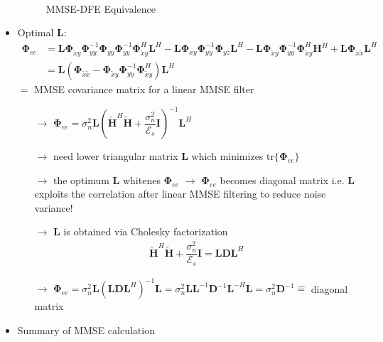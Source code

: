 \documentclass[a4paper, 10pt]{article}
\begin{document}
\begin{itemize}
\begin{align*}
	\end{align*}
	\begin{figure}[h]
		\centering
		\resizebox{\textwidth}{!}{}
		\caption{MMSE-DFE Equivalence}
		\label{MMSE_DFE_Equiv}
	\end{figure}
	\item Optimal $\mathbf{L}$:
	\begin{align*}
		\boldsymbol{\Phi}_{ee}&=\mathbf{L}\boldsymbol{\Phi}_{\tilde{x}y}\boldsymbol{\Phi}_{yy}^{-1}\boldsymbol{\Phi}_{yy}\boldsymbol{\Phi}_{yy}^{-1}\boldsymbol{\Phi}_{\tilde{x}y}^H\mathbf{L}^H
		-\mathbf{L}\boldsymbol{\Phi}_{xy}\boldsymbol{\Phi}_{yy}^{-1}\boldsymbol{\Phi}_{yz}\mathbf{L}^H
		-\mathbf{L}\boldsymbol{\Phi}_{\tilde{x}y}\boldsymbol{\Phi}_{yy}^{-1}\boldsymbol{\Phi}_{\tilde{x}y}^H\mathbf{H}^H+\mathbf{L}\boldsymbol{\Phi}_{\tilde{x}\tilde{x}}\mathbf{L}^H\\ 
		&=\mathbf{L}(\boldsymbol{\Phi}_{\tilde{x}\tilde{x}}-\boldsymbol{\Phi}_{\tilde{x}y}\boldsymbol{\Phi}_{yy}^{-1}\boldsymbol{\Phi}_{\tilde{x}y}^H)\mathbf{L}^H
	\end{align*}
	$=$ MMSE covariance matrix for a linear MMSE filter
	\begin{itemize}
		\item[$\rightarrow$]$\boldsymbol{\Phi}_{ee}=\sigma_n^2\mathbf{L}(\tilde{\mathbf{H}}^H\tilde{\mathbf{H}}+\dfrac{\sigma_n^2}{\mathcal{E}_s}\mathbf{I})^{-1}\mathbf{L}^H$
		\item[$\rightarrow$] need lower triangular matrix $\mathbf{L}$ which minimizes $\mathrm{tr}\{\boldsymbol{\Phi}_{ee}\}$
		\item[$\rightarrow$] the optimum $\mathbf{L}$ whitenes $\boldsymbol{\Phi}_{ee}$ $\rightarrow$  $\boldsymbol{\Phi}_{ee}$ becomes diagonal matrix i.e. $\mathbf{L}$ exploits the correlation after linear MMSE filtering
		to reduce noise variance!
		\item[$\rightarrow$] $\mathbf{L}$ is obtained via Cholesky factorization
		\begin{align*}
			\tilde{\mathbf{H}}^H\tilde{\mathbf{H}}+\dfrac{\sigma_n^2}{\mathcal{E}_s}\mathbf{I}=\mathbf{LDL}^H
		\end{align*}
		\item[$\rightarrow$] $\boldsymbol{\Phi}_{ee}=\sigma_n^2 \mathbf{L}(\mathbf{LDL}^H)^{-1}\mathbf{L}=\sigma_n^2\mathbf{LL}^{-1}\mathbf{D}^{-1}\mathbf{L}^{-H}\mathbf{L}=\sigma_n^2\mathbf{D}^{-1}\widehat{=}$ diagonal matrix
	\end{itemize}
	\item Summary of MMSE calculation

\end{itemize}
\end{document}
